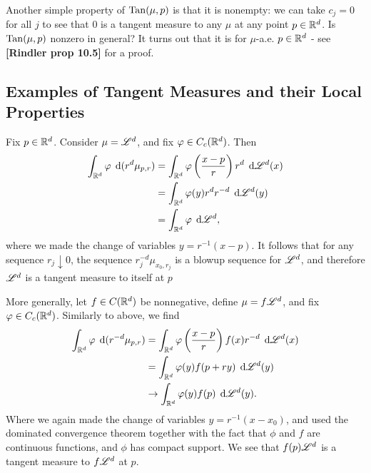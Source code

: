 Another simple property of $\operatorname{Tan}(\mu,p)$ is that it is nonempty: we can take $c_j = 0$ for all $j$ to see that $0$ is a tangent measure to any $\mu$ at any point $p \in \mathbb{R}^d$. Is $\operatorname{Tan}(\mu,p)$ nonzero in general? It turns out that it is for $\mu$-a.e. $p \in \mathbb{R}^d$ - see {\bf [Rindler prop 10.5]} for a proof.

\subsection{Examples of Tangent Measures and their Local Properties} \label{sec:examplesAndLocal}
Fix $p \in \mathbb{R}^d$. Consider $\mu = \mathscr{L}^d$, and fix $\varphi \in C_c(\mathbb{R}^d)$. Then
\begin{equation} \begin{aligned}
    \int_{\mathbb{R}^d} \varphi \; \operatorname{d}\!{(}r^d \mu_{p,r}) &= \int_{\mathbb{R}^d} \varphi\left( \frac{x-p}{r} \right) r^d \; \operatorname{d}\!{\mathscr{L}}^d(x) \\
                                                &= \int_{\mathbb{R}^d} \varphi(y) r^d r^{-d} \; \operatorname{d}\!{\mathscr{L}}^d(y)                     \\
                                                &= \int_{\mathbb{R}^d} \varphi \; \operatorname{d}\!{\mathscr{L}}^d,
\end{aligned} \end{equation}
where we made the change of variables $y = r^{-1}(x-p)$. It follows that for any sequence $r_j \downarrow 0$, the sequence $r_j^{-d} \mu_{x_0,r_j}$ is a blowup sequence for $\mathscr{L}^d$, and therefore $\mathscr{L}^d$ is a tangent measure to itself at $p$

More generally, let $f \in C(\mathbb{R}^d)$ be nonnegative, define $\mu = f \mathscr{L}^d$, and fix $\varphi \in C_c(\mathbb{R}^d)$. Similarly to above, we find 
\begin{equation} \begin{aligned}
    \int_{\mathbb{R}^d} \varphi \; \operatorname{d}\!{(}r^{-d} \mu_{p,r}) &= \int_{\mathbb{R}^d} \varphi\left( \frac{x-p}{r} \right) f(x) r^{-d} \; \operatorname{d}\!{\mathscr{L}}^d(x) \\
                                                    &= \int_{\mathbb{R}^d} \varphi(y) f(p + ry) \; \operatorname{d}\!{\mathscr{L}}^d(y)                            \\
                                                    &\rightarrow \int_{\mathbb{R}^d} \varphi(y) f(p) \; \operatorname{d}\!{\mathscr{L}}^d(y).
\end{aligned} \end{equation}
Where we again made the change of variables $y = r^{-1}(x-x_0)$, and used the dominated convergence theorem together with the fact that $\phi$ and $f$ are continuous functions, and $\phi$ has compact support. We see that $f(p) \mathscr{L}^d$ is a tangent measure to $f \mathscr{L}^d$ at $p$.

